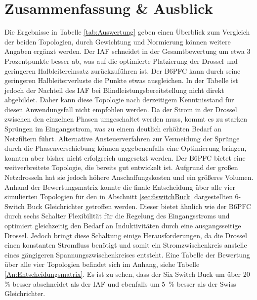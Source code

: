 \chapter{Zusammenfassung \& Ausblick}
Die Ergebnisse in Tabelle \ref{tab:Auswertung} geben einen Überblick zum Vergleich der beiden Topologien, durch Gewichtung und Normierung können weitere Angaben ergänzt werden. Der \gls{IAF} schneidet in der Gesamtbewertung um etwa 3 Prozentpunkte besser ab, was auf die optimierte Platzierung der Drossel und geringeren Halbleitereinsatz zurückzuführen ist. Der \gls{B6PFC} kann durch seine geringeren Halbleiterverluste die Punkte etwas ausgleichen. In der Tabelle ist jedoch der Nachteil des \gls{IAF} bei Blindleistungsbereitstellung nicht direkt abgebildet. Daher kann diese Topologie nach derzeitigem Kenntnisstand für diesen Anwendungsfall nicht empfohlen werden. Da der Strom in der Drossel zwischen den einzelnen Phasen umgeschaltet werden muss, kommt es zu starken Sprüngen im Eingangsstrom, was zu einem deutlich erhöhten Bedarf an Netzfiltern führt. Alternative Ansteuerverfahren zur Vermeidung der Sprünge durch die Phasenverschiebung können gegebenenfalls eine Optimierung bringen, konnten aber bisher nicht erfolgreich umgesetzt werden. Der \gls{B6PFC} bietet eine weitverbreitete Topologie, die bereits gut entwickelt ist. Aufgrund der großen Netzdrosseln hat sie jedoch höhere Anschaffungskosten und ein größeres Volumen. \\ 
Anhand der Bewertungsmatrix konnte die finale Entscheidung über alle vier simulierten Topologien für den in Abschnitt \ref{sec:6switchBuck} dargestellten 6-Switch Buck Gleichrichter getroffen werden. Dieser bietet ähnlich wie der \gls{B6PFC} durch sechs Schalter Flexibilität für die Regelung des Eingangsstroms und optimiert gleichzeitig den Bedarf an Induktivitäten durch eine ausgangsseitige Drossel. Jedoch bringt diese Schaltung einige Herausforderungen, da die Drossel einen konstanten Stromfluss benötigt und somit ein Stromzwischenkreis anstelle eines gängigeren Spannungszwischenkreises entsteht. Eine Tabelle der Bewertung über alle vier Topologien befindet sich im Anhang, siehe Tabelle \ref{An:Entscheidungsmatrix}. Es ist zu sehen, dass der Six Switch Buck um über 20 \% besser abschneidet als der \gls{IAF} und ebenfalls um 5~\% besser als der Swiss Gleichrichter. \\
